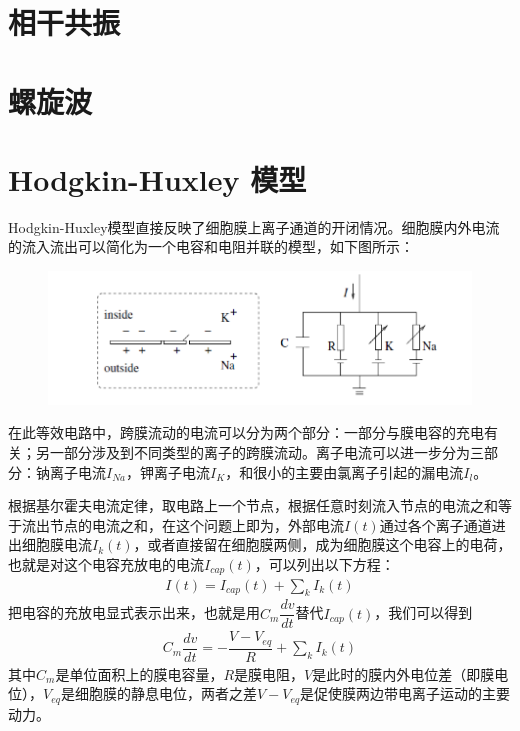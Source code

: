\documentclass[
    bachelor,
    nofont, %
    pdflinks,
    ]{xjtuthesis}
\begin{document}
\section{相干共振}

\section{螺旋波}

\section{Hodgkin-Huxley 模型}

Hodgkin-Huxley模型直接反映了细胞膜上离子通道的开闭情况。细胞膜内外电流的流入流出可以简化为一个电容和电阻并联的模型，如下图所示：
\begin{figure}[!ht]
\centering
\includegraphics[scale=0.8]{moxingjiantu.png}
\end{figure}

在此等效电路中，跨膜流动的电流可以分为两个部分：一部分与膜电容的充电有关；另一部分涉及到不同类型的离子的跨膜流动。离子电流可以进一步分为三部分：钠离子电流$I_{Na}$，钾离子电流$I_K$，和很小的主要由氯离子引起的漏电流$I_l$。

\medskip
根据基尔霍夫电流定律，取电路上一个节点，根据任意时刻流入节点的电流之和等于流出节点的电流之和，在这个问题上即为，外部电流$I(t)$通过各个离子通道进出细胞膜电流$I_{k}(t)$，或者直接留在细胞膜两侧，成为细胞膜这个电容上的电荷，也就是对这个电容充放电的电流$I_{cap}(t)$，可以列出以下方程：
\begin{align}
I(t)=I_{cap}(t)+\sum_k I_{k}(t)
\end{align}
把电容的充放电显式表示出来，也就是用$C_m \dfrac{dv}{dt}$替代$I_{cap}(t)$，我们可以得到
\begin{align}
C_m \dfrac{dv}{dt}=-\dfrac{V-V_{eq}}{R}+\sum_k I_{k}(t)
\end{align}
其中$C_m$是单位面积上的膜电容量，$R$是膜电阻，$V$是此时的膜内外电位差（即膜电位），$V_{eq}$是细胞膜的静息电位，两者之差$V-V_{eq}$是促使膜两边带电离子运动的主要动力。\\
\end{document}
